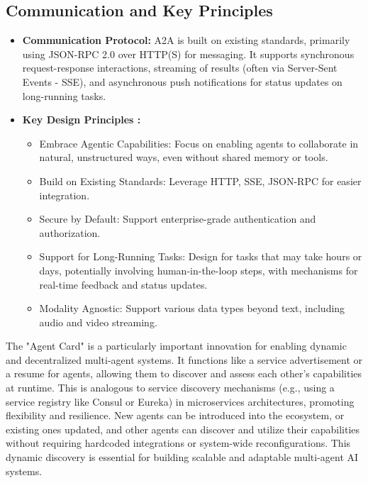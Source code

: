 \subsection*{Communication and Key Principles}

\begin{itemize}
    \item \textbf{Communication Protocol:} A2A is built on existing standards, primarily using JSON-RPC 2.0 over HTTP(S) for messaging.
     It supports synchronous request-response interactions, streaming of results (often via Server-Sent Events - SSE), and asynchronous 
     push notifications for status updates on long-running tasks.
    \item \textbf{Key Design Principles :}
    \begin{itemize}
        \item Embrace Agentic Capabilities: Focus on enabling agents to collaborate in natural, unstructured ways, even without shared memory or tools.
        \item Build on Existing Standards: Leverage HTTP, SSE, JSON-RPC for easier integration.
        \item Secure by Default: Support enterprise-grade authentication and authorization.
        \item Support for Long-Running Tasks: Design for tasks that may take hours or days, potentially involving human-in-the-loop steps, 
        with mechanisms for real-time feedback and status updates.
        \item Modality Agnostic: Support various data types beyond text, including audio and video streaming.
    \end{itemize}
\end{itemize}

The "Agent Card" is a particularly important innovation for enabling dynamic and decentralized multi-agent systems. 
It functions like a service advertisement or a resume for agents, allowing them to discover and assess each other's capabilities at runtime.
This is analogous to service discovery mechanisms (e.g., using a service registry like Consul or Eureka) in microservices architectures, 
promoting flexibility and resilience. New agents can be introduced into the ecosystem, or existing ones updated, and other agents can discover 
and utilize their capabilities without requiring hardcoded integrations or system-wide reconfigurations. This dynamic discovery is essential 
for building scalable and adaptable multi-agent AI systems.

